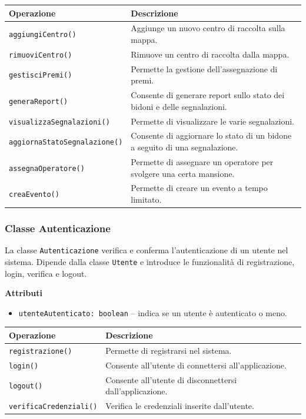 \documentclass[12pt,a4paper]{article}
\begin{document}
\begin{table}[H]
\centering
\begin{tabularx}{\textwidth}{@{}lX@{}}
\toprule
\textbf{Operazione} & \textbf{Descrizione} \\ \midrule
\texttt{aggiungiCentro()} & Aggiunge un nuovo centro di raccolta sulla mappa. \\
\texttt{rimuoviCentro()} & Rimuove un centro di raccolta dalla mappa. \\
\texttt{gestisciPremi()} & Permette la gestione dell'assegnazione di premi. \\
\texttt{generaReport()} & Consente di generare report sullo stato dei bidoni e delle segnalazioni. \\
\texttt{visualizzaSegnalazioni()} & Permette di visualizzare le varie segnalazioni. \\   
\texttt{aggiornaStatoSegnalazione()} & Consente di aggiornare lo stato di un bidone a seguito di una segnalazione. \\
\texttt{assegnaOperatore()} & Permette di assegnare un operatore per svolgere una certa mansione. \\
\texttt{creaEvento()} & Permette di creare un evento a tempo limitato. \\
\end{tabularx}
\end{table}

\subsubsection{Classe Autenticazione}
La classe \texttt{Autenticazione} verifica e conferma l'autenticazione di un utente nel sistema. 
Dipende dalla classe \texttt{Utente} e introduce le funzionalità di registrazione, login, verifica e logout.

\textbf{Attributi}
\begin{itemize}
    \item \texttt{utenteAutenticato: boolean} -- indica se un utente è autenticato o meno.
\end{itemize}

\begin{table}[H]
\centering
\begin{tabularx}{\textwidth}{@{}lX@{}}
\toprule
\textbf{Operazione} & \textbf{Descrizione} \\ \midrule
\texttt{registrazione()} & Permette di registrarsi nel sistema. \\
\texttt{login()} & Consente all'utente di connettersi all'applicazione. \\
\texttt{logout()} & Consente all'utente di disconnettersi dall'applicazione. \\
\texttt{verificaCredenziali()} & Verifica le credenziali inserite dall'utente. \\
\end{tabularx}
\end{table}
\end{document}
